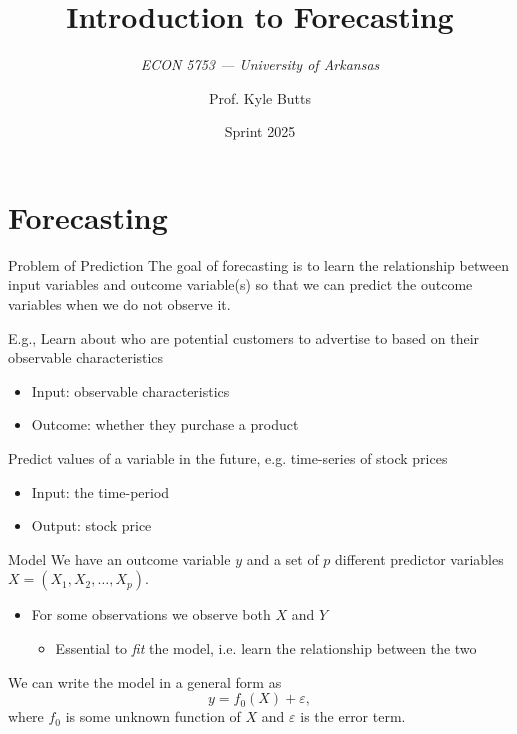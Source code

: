 \documentclass[aspectratio=169,t,11pt,table]{beamer}
\title{Introduction to Forecasting}
\subtitle{\it  ECON 5753 — University of Arkansas}
\date{Sprint 2025}
\author{Prof. Kyle Butts}
\begin{document}
\begin{frame}
\maketitle
\end{frame}


\section{Forecasting}

\begin{frame}{Problem of Prediction}
  The goal of forecasting is to learn the relationship between \alert{input variables} and \alert{outcome variable(s)} so that we can \alert{predict} the outcome variables when we do not observe it. 

  \pause
  \bigskip
  E.g., Learn about who are potential customers to advertise to based on their observable characteristics
  \begin{itemize}
    \item Input: observable characteristics
    \item Outcome: whether they purchase a product
  \end{itemize}
    
  \pause
  \bigskip
  Predict values of a variable in the future, e.g. \alert{time-series} of stock prices
  \begin{itemize}
    \item Input: the time-period
    \item Output: stock price
  \end{itemize}
\end{frame}

\begin{frame}{Model}
  We have an outcome variable $y$ and a set of $p$ different predictor variables $X = (X_1, X_2, \dots, X_p)$. 
  \begin{itemize}
    \item For some observations we observe both $X$ and $Y$
    \begin{itemize}
      \item Essential to \alert{\emph{fit}} the model, i.e. learn the relationship between the two
    \end{itemize}
  \end{itemize}

  \bigskip
  We can write the model in a general form as
  $$
    y = f_0(X) + \varepsilon,
  $$
  where $f_0$ is some unknown function of $X$ and $\varepsilon$ is the \alert{error term}.
\end{frame}
\end{document}
